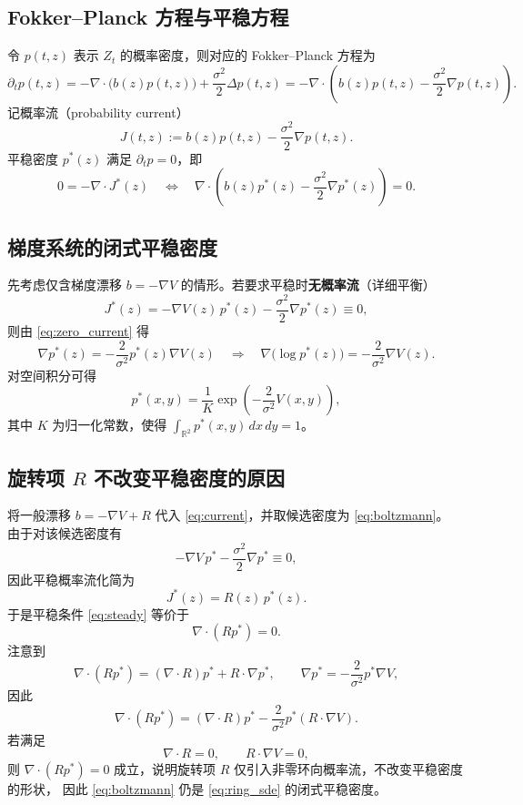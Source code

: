 	\subsection{Fokker--Planck 方程与平稳方程}
	
	令 $p(t,z)$ 表示 $Z_t$ 的概率密度，则对应的 Fokker--Planck 方程为
	\begin{equation}\label{eq:FP}
		\partial_t p(t,z)=-\nabla\cdot\big(b(z)p(t,z)\big)+\frac{\sigma^2}{2}\Delta p(t,z)
		=-\nabla\cdot\left(b(z)p(t,z)-\frac{\sigma^2}{2}\nabla p(t,z)\right).
	\end{equation}
	记概率流（probability current）
	\begin{equation}\label{eq:current}
		J(t,z):=b(z)p(t,z)-\frac{\sigma^2}{2}\nabla p(t,z).
	\end{equation}
	平稳密度 $p^*(z)$ 满足 $\partial_t p=0$，即
	\begin{equation}\label{eq:steady}
		0=-\nabla\cdot J^*(z)
		\quad\Longleftrightarrow\quad
		\nabla\cdot\left(b(z)p^*(z)-\frac{\sigma^2}{2}\nabla p^*(z)\right)=0.
	\end{equation}
	
	\subsection{梯度系统的闭式平稳密度}
	
	先考虑仅含梯度漂移 $b=-\nabla V$ 的情形。若要求平稳时\textbf{无概率流}（详细平衡）
	\begin{equation}\label{eq:zero_current}
		J^*(z)= -\nabla V(z)\,p^*(z)-\frac{\sigma^2}{2}\nabla p^*(z)\equiv 0,
	\end{equation}
	则由 \eqref{eq:zero_current} 得
	\[
	\nabla p^*(z)=-\frac{2}{\sigma^2}p^*(z)\nabla V(z)
	\quad\Longrightarrow\quad
	\nabla\big(\log p^*(z)\big)=-\frac{2}{\sigma^2}\nabla V(z).
	\]
	对空间积分可得
	\begin{equation}\label{eq:boltzmann}
		p^*(x,y)=\frac{1}{K}\exp\!\left(-\frac{2}{\sigma^2}V(x,y)\right),
	\end{equation}
	其中 $K$ 为归一化常数，使得 $\int_{\mathbb{R}^2}p^*(x,y)\,dx\,dy=1$。
	
	\subsection{旋转项 $R$ 不改变平稳密度的原因}
	
	将一般漂移 $b=-\nabla V+R$ 代入 \eqref{eq:current}，并取候选密度为 \eqref{eq:boltzmann}。
	由于对该候选密度有
	\[
	-\nabla V\,p^*-\frac{\sigma^2}{2}\nabla p^*\equiv 0,
	\]
	因此平稳概率流化简为
	\[
	J^*(z)=R(z)\,p^*(z).
	\]
	于是平稳条件 \eqref{eq:steady} 等价于
	\[
	\nabla\cdot(Rp^*)=0.
	\]
	注意到
	\[
	\nabla\cdot(Rp^*)=(\nabla\cdot R)p^*+R\cdot\nabla p^*,
	\qquad
	\nabla p^*=-\frac{2}{\sigma^2}p^*\nabla V,
	\]
	因此
	\[
	\nabla\cdot(Rp^*)=(\nabla\cdot R)p^*-\frac{2}{\sigma^2}p^*(R\cdot\nabla V).
	\]
	若满足
	\begin{equation}\label{eq:cond}
		\nabla\cdot R=0,\qquad R\cdot\nabla V=0,
	\end{equation}
	则 $\nabla\cdot(Rp^*)=0$ 成立，说明旋转项 $R$ 仅引入非零环向概率流，不改变平稳密度的形状，
	因此 \eqref{eq:boltzmann} 仍是 \eqref{eq:ring_sde} 的闭式平稳密度。
	
